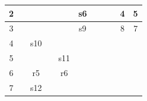 \documentclass{article}
\begin{document}
\begin{latin}
\begin{table}[H]
\begin{tabular}{|ccccccccccc|}
\multicolumn{1}{|c|}{{\color[HTML]{0000FF} 2}}         & \multicolumn{1}{c|}{}           & \multicolumn{1}{c|}{}           & \multicolumn{1}{c|}{}           & \multicolumn{1}{c|}{}           & \multicolumn{1}{c|}{s6}         & \multicolumn{1}{c|}{}                           & \multicolumn{1}{c|}{}            & \multicolumn{1}{c|}{}                         & \multicolumn{1}{c|}{{\color[HTML]{0000FF} 4}} & {\color[HTML]{0000FF} 5} \\ \hline
\multicolumn{1}{|c|}{{\color[HTML]{0000FF} 3}}         & \multicolumn{1}{c|}{}           & \multicolumn{1}{c|}{}           & \multicolumn{1}{c|}{}           & \multicolumn{1}{c|}{}           & \multicolumn{1}{c|}{s9}         & \multicolumn{1}{c|}{}                           & \multicolumn{1}{c|}{}            & \multicolumn{1}{c|}{}                         & \multicolumn{1}{c|}{{\color[HTML]{0000FF} 8}} & {\color[HTML]{0000FF} 7} \\ \hline
\multicolumn{1}{|c|}{{\color[HTML]{0000FF} 4}}         & \multicolumn{1}{c|}{}           & \multicolumn{1}{c|}{s10}        & \multicolumn{1}{c|}{}           & \multicolumn{1}{c|}{}           & \multicolumn{1}{c|}{}           & \multicolumn{1}{c|}{}                           & \multicolumn{1}{c|}{}            & \multicolumn{1}{c|}{}                         & \multicolumn{1}{c|}{}                         &                          \\ \hline
\multicolumn{1}{|c|}{{\color[HTML]{0000FF} 5}}         & \multicolumn{1}{c|}{}           & \multicolumn{1}{c|}{}           & \multicolumn{1}{c|}{}           & \multicolumn{1}{c|}{s11}        & \multicolumn{1}{c|}{}           & \multicolumn{1}{c|}{}                           & \multicolumn{1}{c|}{}            & \multicolumn{1}{c|}{}                         & \multicolumn{1}{c|}{}                         &                          \\ \hline
\multicolumn{1}{|c|}{{\color[HTML]{0000FF} 6}}         & \multicolumn{1}{c|}{}           & \multicolumn{1}{c|}{r5}         & \multicolumn{1}{c|}{}           & \multicolumn{1}{c|}{r6}         & \multicolumn{1}{c|}{}           & \multicolumn{1}{c|}{}                           & \multicolumn{1}{c|}{}            & \multicolumn{1}{c|}{}                         & \multicolumn{1}{c|}{}                         &                          \\ \hline
\multicolumn{1}{|c|}{{\color[HTML]{0000FF} 7}}         & \multicolumn{1}{c|}{}           & \multicolumn{1}{c|}{s12}        & \multicolumn{1}{c|}{}           & \multicolumn{1}{c|}{}           & \multicolumn{1}{c|}{}           & \multicolumn{1}{c|}{}                           & \multicolumn{1}{c|}{}            & \multicolumn{1}{c|}{}                         & \multicolumn{1}{c|}{}                         &                          \\ \hline

\end{tabular}
\end{table}
\end{latin}
\end{document}
